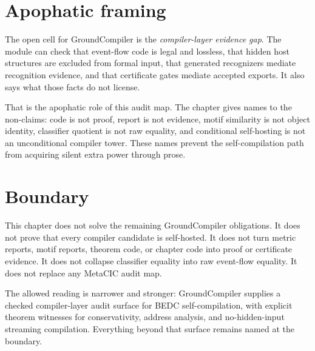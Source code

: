 \section{Apophatic framing}
\label{sec:bedc-groundcompiler-audit-map-apophatic-framing}

The open cell for GroundCompiler is the \emph{compiler-layer evidence gap}.
The module can check that event-flow code is legal and lossless, that hidden
host structures are excluded from formal input, that generated recognizers
mediate recognition evidence, and that certificate gates mediate accepted
exports. It also says what those facts do not license.

That is the apophatic role of this audit map. The chapter gives names to the
non-claims: code is not proof, report is not evidence, motif similarity is not
object identity, classifier quotient is not raw equality, and conditional
self-hosting is not an unconditional compiler tower. These names prevent the
self-compilation path from acquiring silent extra power through prose.

\section{Boundary}
\label{sec:bedc-groundcompiler-audit-map-boundary}

This chapter does not solve the remaining GroundCompiler obligations. It does
not prove that every compiler candidate is self-hosted. It does not turn metric
reports, motif reports, theorem code, or chapter code into proof or
certificate evidence. It does not collapse classifier equality into raw
event-flow equality. It does not replace any MetaCIC audit map.

The allowed reading is narrower and stronger: GroundCompiler supplies a
checked compiler-layer audit surface for BEDC self-compilation, with explicit
theorem witnesses for conservativity, address analysis, and no-hidden-input
streaming compilation. Everything beyond that surface remains named at the
boundary.


